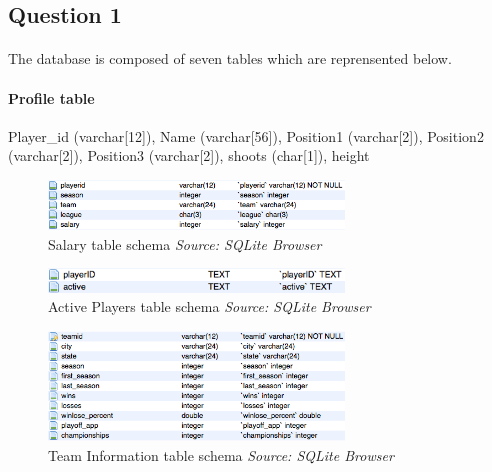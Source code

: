 
\subsection{Question 1}
\label{subsec:411}

\paragraph{}The database is composed of seven tables which are reprensented below.
\paragraph{Profile table}Player_id (varchar[12]), Name (varchar[56]), Position1 (varchar[2]), Position2 (varchar[2]), Position3 (varchar[2]), shoots (char[1]), height

\begin{figure}[h!]
	\begin{center}
		\includegraphics[width=0.7\textwidth]{./images/salary}
		\caption{Salary table schema \textit{Source: SQLite Browser}}
		\label{fig:411-4}
	\end{center}
\end{figure}

\begin{figure}[h!]
	\begin{center}
		\includegraphics[width=0.7\textwidth]{./images/activeplayers}
		\caption{Active Players table schema \textit{Source: SQLite Browser}}
		\label{fig:411-5}
	\end{center}
\end{figure}

\begin{figure}[h!]
	\begin{center}
		\includegraphics[width=0.7\textwidth]{./images/teaminfo}
		\caption{Team Information table schema \textit{Source: SQLite Browser}}
		\label{fig:411-6}
	\end{center}
\end{figure}

